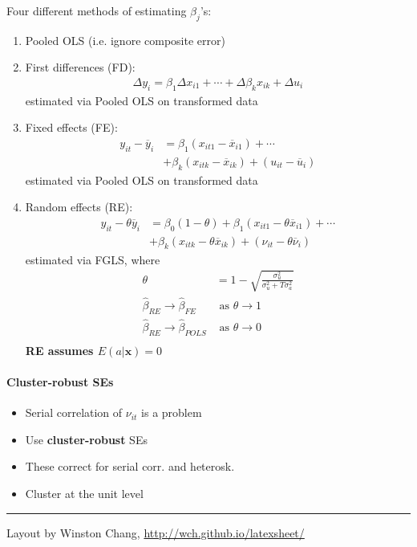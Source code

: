 \documentclass[10pt,landscape]{article}
\begin{document}
\begin{multicols}{3}
\medskip{}

Four different methods of estimating $\beta_j$'s:
\begin{enumerate}
    \item Pooled OLS (i.e. ignore composite error)
    \item First differences (FD):
\begin{align*}
    \Delta y_{i} = \beta_1 \Delta x_{i1} + \cdots + \Delta \beta_k x_{ik} + \Delta u_{i}
\end{align*}
estimated via Pooled OLS on transformed data
    \item Fixed effects (FE):
\begin{align*}
    y_{it}-\overline{y}_{i} &= \beta_1 \left(x_{it1}-\overline{x}_{i1}\right) + \cdots \\
    &+\beta_k \left( x_{itk}-\overline{x}_{ik}\right) + \left(u_{it}-\overline{u}_{i}\right)
\end{align*}
estimated via Pooled OLS on transformed data
    \item Random effects (RE):
\begin{align*}
    y_{it}-\theta\overline{y}_{i} &= \beta_0 \left(1-\theta\right) + \beta_1 \left(x_{it1}-\theta\overline{x}_{i1}\right) + \cdots \\
    &+\beta_k \left( x_{itk}-\theta\overline{x}_{ik}\right) + \left(\nu_{it}-\theta\overline{\nu}_{i}\right)
\end{align*}
estimated via FGLS, where
\begin{align*}
    \theta &= 1-\sqrt{\frac{\sigma^2_u}{\sigma^2_u + T\sigma^2_a}} \\
    \hat{\beta}_{RE} \rightarrow \hat{\beta}_{FE} & \text{ as } \theta \rightarrow 1 \\
    \hat{\beta}_{RE} \rightarrow \hat{\beta}_{POLS} & \text{ as } \theta \rightarrow 0 \\
\end{align*}
\textbf{RE assumes $E\left(a\vert\mathbf{x}\right)= 0$}
\end{enumerate}

\paragraph{Cluster-robust SEs}
\begin{itemize}
    \item Serial correlation of $\nu_{it}$ is a problem
    \item Use \textbf{cluster-robust} SEs
    \item These correct for serial corr. and heterosk.
    \item Cluster at the unit level
\end{itemize}


\textcolor{white}{\lipsum[1-5]}

\rule{0.3\linewidth}{0.25pt}
\scriptsize

Layout by Winston Chang, \href{http://wch.github.io/latexsheet/}{http://wch.github.io/latexsheet/}
\end{multicols}
\end{document}

